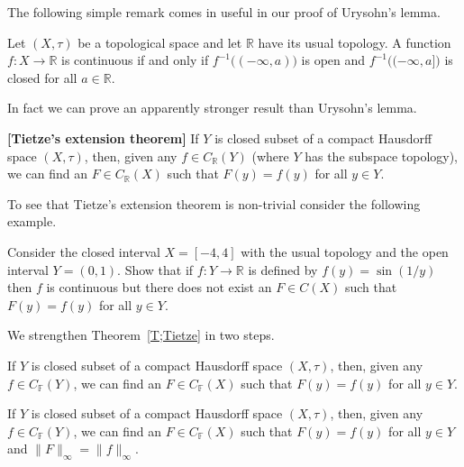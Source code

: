 The following simple remark comes in useful in our
proof of Urysohn's lemma.
\begin{exercise} Let $(X,\tau)$ be a topological space
and let ${\mathbb R}$ have its usual topology.
A function $f:X\rightarrow {\mathbb R}$ is continuous
if and only if $f^{-1}\big((-\infty,a)\big)$ is open
and  $f^{-1}\big((-\infty,a]\big)$ is closed for all $a\in{\mathbb R}$.
\end {exercise}


In fact we can prove an apparently stronger result than Urysohn's
lemma.
\begin{theorem} {\bf[Tietze's extension theorem]}\label{T;Tietze}
If $Y$ is closed subset of a compact Hausdorff space
$(X,\tau)$, then, given any $f\in C_{\mathbb R}(Y)$
(where $Y$ has the subspace topology), we can find
an $F\in C_{\mathbb R}(X)$ such that $F(y)=f(y)$ for all $y\in Y$.
\end{theorem}

To see that Tietze's extension theorem is non-trivial
consider the following example.
\begin{exercise} Consider the closed interval
$X=[-4,4]$ with the usual topology
and the open interval $Y=(0,1)$. Show that if $f:Y\rightarrow{\mathbb R}$ 
is defined by $f(y)=\sin(1/y)$ then $f$ is continuous
but  there does not exist an
$F\in C(X)$ such that $F(y)=f(y)$ for all $y\in Y$.
\end{exercise}

We strengthen Theorem~\ref{T;Tietze} in two steps.
\begin{corollary}  If $Y$ is closed subset of a compact Hausdorff space
$(X,\tau)$, then, given any $f\in C_{\mathbb F}(Y)$,
we can find
an $F\in C_{\mathbb F}(X)$ such that $F(y)=f(y)$ for all $y\in Y$.
\end{corollary}
\begin{corollary}  If $Y$ is closed subset of a compact Hausdorff space
$(X,\tau)$, then, given any $f\in C_{\mathbb F}(Y)$,
we can find
an $F\in C_{\mathbb F}(X)$ such that $F(y)=f(y)$ for all $y\in Y$
and $\|F\|_{\infty}=\|f\|_{\infty}$.
\end{corollary}
